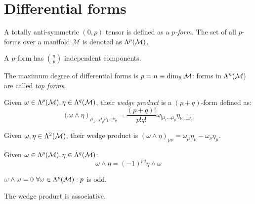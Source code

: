 \section{Differential forms}

\begin{definition}
  A totally anti-symmetric $ (0,p) $ tensor is defined as a \textit{$ p $-form}. The set of all $ p $-forms over a manifold $ \mathcal{M} $ is denoted as $ \Lambda^{p}(\mathcal{M}) $.
\end{definition}

\begin{proposition}
  A $ p $-form has $ \binom{n}{p} $ independent components. 
\end{proposition}
\begin{proposition}
  The maximum degree of differential forms is $ p = n \equiv \dim_{\mathbb{R}}\mathcal{M} $: forms in $ \Lambda^{n}(\mathcal{M}) $ are called \textit{top forms}.
\end{proposition}

\begin{definition}
  Given $ \omega \in \Lambda^{p}(\mathcal{M}), \eta \in \Lambda^{q}(\mathcal{M}) $, their \textit{wedge product} is a $ (p+q) $-form defined as:
  \begin{equation}
    (\omega \wedge \eta)_{\mu_1 \dots \mu_p \nu_1 \dots \nu_q} = \frac{(p + q)!}{p! q!} \omega_{[\mu_1 \dots \mu_p} \eta_{\nu_1 \dots \nu_q]}
    \label{eq:2.33}
  \end{equation}
\end{definition}

\begin{example}
  Given $ \omega,\eta \in \Lambda^{2}(\mathcal{M}) $, their wedge product is $ (\omega \wedge \eta)_{\mu \nu} = \omega_{\mu} \eta_{\nu} - \omega_{\nu} \eta_{\mu} $.
\end{example}

\begin{proposition}
  Given $ \omega \in\Lambda^{p}(\mathcal{M}), \eta \in\Lambda^{q}(\mathcal{M}) $:
  \begin{equation}
    \omega \wedge \eta = (-1)^{pq} \eta \wedge \omega
    \label{eq:2.34}
  \end{equation}
\end{proposition}

\begin{propcorollary}
  $ \omega \wedge \omega = 0 \,\,\forall \omega \in\Lambda^{p}(\mathcal{M}) : p $ is odd.
\end{propcorollary}

\begin{proposition}
  The wedge product is associative.
\end{proposition}

